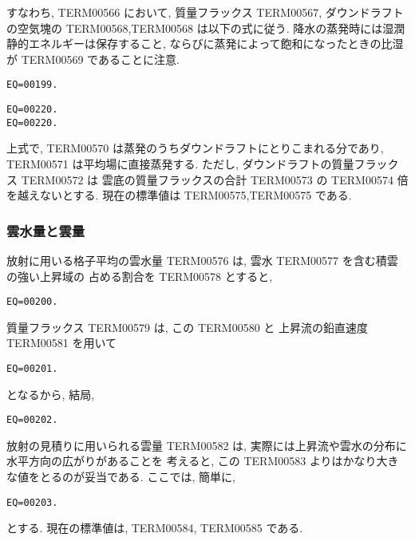 すなわち, TERM00566 において, 質量フラックス TERM00567, 
ダウンドラフトの空気塊の TERM00568,TERM00568 は以下の式に従う.
降水の蒸発時には湿潤静的エネルギーは保存すること,
ならびに蒸発によって飽和になったときの比湿が
TERM00569 であることに注意. 
\begin{verbatim}
EQ=00199.
\end{verbatim}
\begin{verbatim}
EQ=00220.
EQ=00220.
\end{verbatim}

上式で, TERM00570 は蒸発のうちダウンドラフトにとりこまれる分であり,
TERM00571 は平均場に直接蒸発する. 
ただし, ダウンドラフトの質量フラックス TERM00572 は
雲底の質量フラックスの合計 TERM00573 の TERM00574 倍を越えないとする.
現在の標準値は TERM00575,TERM00575 である.

\subsubsection{雲水量と雲量}

放射に用いる格子平均の雲水量 TERM00576 は, 
雲水 TERM00577 を含む積雲の強い上昇域の
占める割合を TERM00578 とすると,
\begin{verbatim}
EQ=00200.
\end{verbatim}
質量フラックス TERM00579 は, この TERM00580 と
上昇流の鉛直速度 TERM00581 を用いて
\begin{verbatim}
EQ=00201.
\end{verbatim}
となるから, 結局,
\begin{verbatim}
EQ=00202.
\end{verbatim}

放射の見積りに用いられる雲量 TERM00582  は, 
実際には上昇流や雲水の分布に水平方向の広がりがあることを
考えると, この TERM00583  よりはかなり大きな値をとるのが妥当である.
ここでは, 簡単に, 
\begin{verbatim}
EQ=00203.
\end{verbatim}
とする.
現在の標準値は, TERM00584, TERM00585 である.
